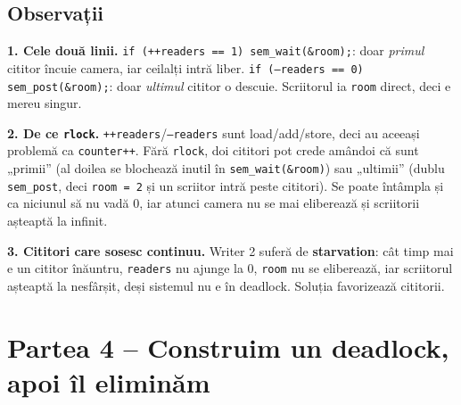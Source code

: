 \documentclass[11pt,a4paper]{article}
\begin{document}
\subsection*{Observații}
\begin{answer}
\textbf{1. Cele două linii.} \texttt{if (++readers == 1) sem\_wait(\&room);}: doar \emph{primul} cititor încuie camera,
iar ceilalți intră liber. \texttt{if (--readers == 0) sem\_post(\&room);}: doar \emph{ultimul} cititor o descuie.
Scriitorul ia \texttt{room} direct, deci e mereu singur.

\medskip
\textbf{2. De ce \texttt{rlock}.} \texttt{++readers}/\texttt{--readers} sunt load/add/store, deci au aceeași problemă ca
\texttt{counter++}. Fără \texttt{rlock}, doi cititori pot crede amândoi că sunt „primii” (al doilea se blochează inutil în
\texttt{sem\_wait(\&room)}) sau „ultimii” (dublu \texttt{sem\_post}, deci \texttt{room = 2} și un scriitor intră peste
cititori). Se poate întâmpla și ca niciunul să nu vadă 0, iar atunci camera nu se mai eliberează și scriitorii așteaptă
la infinit.

\medskip
\textbf{3. Cititori care sosesc continuu.} Writer 2 suferă de \textbf{starvation}: cât timp mai e un cititor înăuntru,
\texttt{readers} nu ajunge la 0, \texttt{room} nu se eliberează, iar scriitorul așteaptă la nesfârșit, deși sistemul nu e
în deadlock. Soluția favorizează cititorii.
\end{answer}

\section{Partea 4 -- Construim un deadlock, apoi îl eliminăm}
\end{document}
